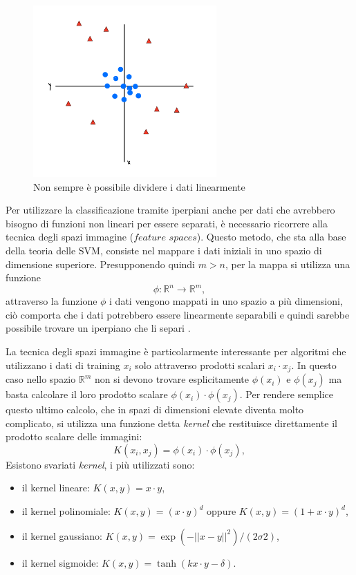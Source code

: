 \documentclass[12pt,italian]{report}
\begin{document}
\begin{figure}[h]
	\centering
	\includegraphics[width = 70mm]{immagini/nonLineare}
	\caption{Non sempre è possibile dividere i dati linearmente}
\end{figure}

Per utilizzare la classificazione tramite iperpiani anche per dati che avrebbero bisogno di funzioni non lineari per essere separati, è necessario ricorrere alla tecnica degli spazi immagine ($feature$ $spaces$). Questo metodo, che sta alla base della teoria delle SVM, consiste nel mappare i dati iniziali in uno spazio di dimensione superiore.  Presupponendo quindi $m > n$, per la mappa si utilizza una funzione
\begin{equation}
	\phi: \mathbb{R}^{n} \rightarrow \mathbb{R}^{m},
\end{equation}
attraverso la funzione $\phi$ i dati vengono mappati in uno spazio a più dimensioni, ciò comporta che i dati potrebbero essere linearmente separabili e quindi sarebbe possibile trovare un iperpiano che li separi \cite{LectureNotesNg}.

La tecnica degli spazi immagine è particolarmente interessante per algoritmi che utilizzano i dati di training $x_i$ solo attraverso prodotti scalari $x_i \cdot x_j$. In questo caso nello spazio $\mathbb{R}^{m}$ non si devono trovare esplicitamente $\phi(x_i)$ e $\phi (x_j)$ ma basta calcolare il loro prodotto scalare $\phi (x_i) \cdot \phi (x_j)$. Per rendere semplice questo ultimo calcolo, che in spazi di dimensioni elevate diventa molto complicato, si utilizza una funzione detta \textit{kernel} che restituisce direttamente il prodotto scalare delle immagini:
\begin{equation}
K(x_i, x_j) = \phi (x_i) \cdot \phi (x_j),
\end{equation}
Esistono svariati \textit{kernel}, i più utilizzati sono:
\begin{itemize}
	\item il kernel lineare: $K(x, y) = x \cdot y$,
	\item il kernel polinomiale: $K(x, y) = (x \cdot y)^{d}$ oppure $K(x, y) = (1 + x \cdot y)^{d}$,
	\item il kernel gaussiano: $K(x,y) = \exp (- \left || x-y \right || ^2)/(2 \sigma 2)$,
	\item il kernel sigmoide: $K(x,y) = \tanh(k x \cdot y - \delta)$.
\end{itemize}
\end{document}
